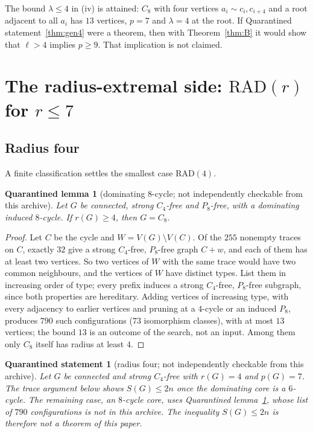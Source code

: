 \documentclass[11pt]{amsart}
\newtheorem{qrecord}[theorem]{Quarantined statement}
\newtheorem{qlemma}[theorem]{Quarantined lemma}
\theoremstyle{definition}
\theoremstyle{remark}
\newcommand{\lr}{\ell}
\newcommand{\pp}{p}
\newcommand{\RAD}{\mathrm{RAD}}
\begin{document}
The bound $\lambda\le4$ in (iv) is attained: $C_8$ with four vertices $a_i\sim c_i,c_{i+4}$ and a root adjacent to all $a_i$ has $13$ vertices, $\pp=7$ and $\lambda=4$ at the root. If Quarantined statement~\ref{thm:gen4} were a theorem, then with Theorem~\ref{thm:B} it would show that $\lr>4$ implies $\pp\ge9$. That implication is not claimed.

\section{The radius-extremal side: \texorpdfstring{$\RAD(r)$}{RAD(r)} for \texorpdfstring{$r\le7$}{r<=7}}\label{sec:rad}
\subsection{Radius four}\label{sec:r4}
A finite classification settles the smallest case $\RAD(4)$.

\begin{qlemma}[dominating $8$-cycle; not independently checkable from this archive]\label{lem:c8}
Let $G$ be connected, strong $C_4$-free and $P_8$-free, with a dominating induced $8$-cycle. If $r(G)\ge4$, then $G=C_8$.
\end{qlemma}

\begin{proof}
Let $C$ be the cycle and $W=V(G)\setminus V(C)$. Of the $255$ nonempty traces on $C$, exactly $32$ give a strong $C_4$-free, $P_8$-free graph $C+w$, and each of them has at least two vertices. So two vertices of $W$ with the same trace would have two common neighbours, and the vertices of $W$ have distinct types. List them in increasing order of type; every prefix induces a strong $C_4$-free, $P_8$-free subgraph, since both properties are hereditary. Adding vertices of increasing type, with every adjacency to earlier vertices and pruning at a $4$-cycle or an induced $P_8$, produces $790$ such configurations ($73$ isomorphism classes), with at most $13$ vertices; the bound $13$ is an outcome of the search, not an input. Among them only $C_8$ itself has radius at least $4$.
\end{proof}

\begin{qrecord}[radius four; not independently checkable from this archive]\label{thm:r4}
Let $G$ be connected and strong $C_4$-free with $r(G)=4$ and $\pp(G)=7$. The trace argument below shows $S(G)\le2n$ once the dominating core is a $6$-cycle. The remaining case, an $8$-cycle core, uses Quarantined lemma~\ref{lem:c8}, whose list of $790$ configurations is not in this archive. The inequality $S(G)\le2n$ is therefore not a theorem of this paper.
\end{qrecord}
\end{document}
